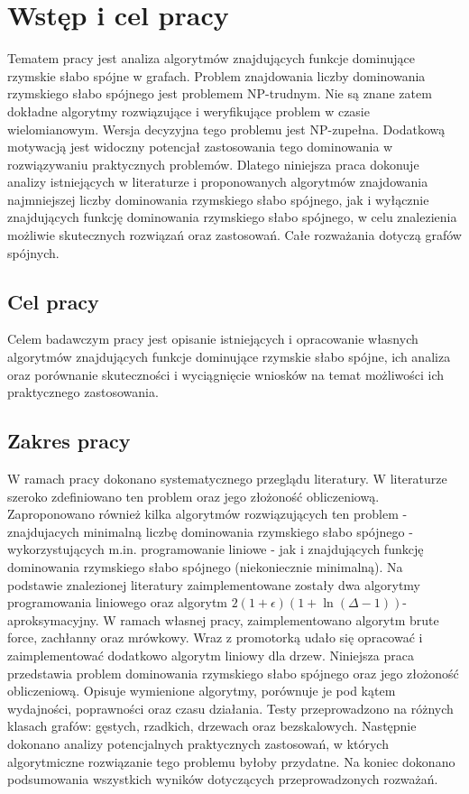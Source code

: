 \chapter{Wstęp i cel pracy}
Tematem pracy jest analiza algorytmów znajdujących funkcje dominujące rzymskie słabo spójne w grafach.
Problem znajdowania liczby dominowania rzymskiego słabo spójnego jest problemem NP-trudnym. Nie są znane zatem dokładne algorytmy rozwiązujące i weryfikujące problem w czasie wielomianowym. Wersja decyzyjna tego problemu jest NP-zupełna. Dodatkową motywacją jest widoczny potencjał zastosowania tego dominowania w rozwiązywaniu praktycznych problemów. Dlatego niniejsza praca dokonuje analizy istniejących w literaturze i proponowanych algorytmów znajdowania najmniejszej liczby dominowania rzymskiego słabo spójnego, jak i wyłącznie znajdujących funkcję dominowania rzymskiego słabo spójnego, w celu znalezienia możliwie skutecznych rozwiązań oraz zastosowań. Całe rozważania dotyczą grafów spójnych.

\section{Cel pracy}
Celem badawczym pracy jest opisanie istniejących i opracowanie własnych algorytmów znajdujących funkcje dominujące rzymskie słabo spójne, ich analiza oraz porównanie skuteczności i wyciągnięcie wniosków na temat możliwości ich praktycznego zastosowania.

\section{Zakres pracy}
W ramach pracy dokonano systematycznego przeglądu literatury. W literaturze szeroko zdefiniowano ten problem oraz jego złożoność obliczeniową. Zaproponowano również kilka algorytmów rozwiązujących ten problem - znajdujacych minimalną liczbę dominowania rzymskiego słabo spójnego - wykorzystujących m.in. programowanie liniowe - jak i znajdujących funkcję dominowania rzymskiego słabo spójnego (niekoniecznie minimalną). Na podstawie znalezionej literatury zaimplementowane zostały dwa algorytmy programowania liniowego oraz algorytm $2(1+\epsilon)(1 + \ln(\Delta - 1))$-aproksymacyjny. W ramach własnej pracy, zaimplementowano algorytm brute force, zachłanny oraz mrówkowy. Wraz z promotorką udało się opracować i zaimplementować dodatkowo algorytm liniowy dla drzew. Niniejsza praca przedstawia problem dominowania rzymskiego słabo spójnego oraz jego złożoność obliczeniową. Opisuje wymienione algorytmy, porównuje je pod kątem wydajności, poprawności oraz czasu działania. Testy przeprowadzono na różnych klasach grafów: gęstych, rzadkich, drzewach oraz bezskalowych. Następnie dokonano analizy potencjalnych praktycznych zastosowań, w których algorytmiczne rozwiązanie tego problemu byłoby przydatne. Na koniec dokonano podsumowania wszystkich wyników dotyczących przeprowadzonych rozważań.